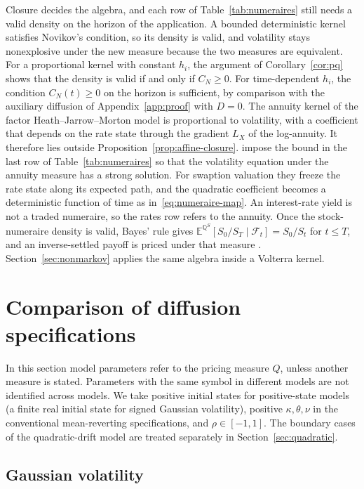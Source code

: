 \documentclass[11pt,a4paper]{article}
\theoremstyle{definition}
\theoremstyle{remark}
\newcommand{\E}{\mathbb{E}}
\newcommand{\QS}{\mathbb{Q}^{S}}
\begin{document}
Closure decides the algebra, and each row of Table~\ref{tab:numeraires} still needs a valid density on the horizon of the application. A bounded deterministic kernel satisfies Novikov's condition, so its density is valid, and volatility stays nonexplosive under the new measure because the two measures are equivalent. For a proportional kernel with constant \(h_i\), the argument of Corollary~\ref{cor:pq} shows that the density is valid if and only if \(C_N\geq0\). For time-dependent \(h_i\), the condition \(C_N(t)\geq0\) on the horizon is sufficient, by comparison with the auxiliary diffusion of Appendix~\ref{app:proof} with \(D=0\). The annuity kernel of the factor Heath--Jarrow--Morton model is proportional to volatility, with a coefficient that depends on the rate state through the gradient \(L_X\) of the log-annuity. It therefore lies outside Proposition~\ref{prop:affine-closure}. \citet{SeppRakhmonovFHJM2025} impose the bound in the last row of Table~\ref{tab:numeraires} so that the volatility equation under the annuity measure has a strong solution. For swaption valuation they freeze the rate state along its expected path, and the quadratic coefficient becomes a deterministic function of time as in~\eqref{eq:numeraire-map}. An interest-rate yield is not a traded numeraire, so the rates row refers to the annuity. Once the stock-numeraire density is valid, Bayes' rule gives \(\E^{\QS}[S_0/S_T\mid\mathcal F_t]=S_0/S_t\) for \(t\leq T\), and an inverse-settled payoff is priced under that measure \citep{LucicSepp2024}. Section~\ref{sec:nonmarkov} applies the same algebra inside a Volterra kernel.

\section{Comparison of diffusion specifications}
\label{sec:diffusions}

In this section model parameters refer to the pricing measure \(Q\), unless another measure is stated. Parameters with the same symbol in different models are not identified across models. We take positive initial states for positive-state models (a finite real initial state for signed Gaussian volatility), positive \(\kappa,\theta,\nu\) in the conventional mean-reverting specifications, and \(\rho\in[-1,1]\). The boundary cases of the quadratic-drift model are treated separately in Section~\ref{sec:quadratic}.

\subsection{Gaussian volatility}
\end{document}
